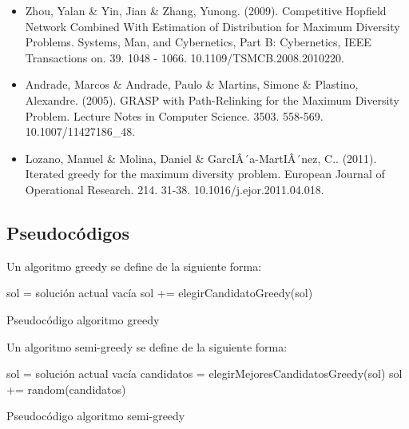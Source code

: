 \documentclass[13pt,a4paper]{article}
\begin{document}
\begin{itemize}
    \item Zhou, Yalan \& Yin, Jian \& Zhang, Yunong. (2009). Competitive Hopfield Network Combined With Estimation of Distribution for Maximum Diversity Problems. Systems, Man, and Cybernetics, Part B: Cybernetics, IEEE Transactions on. 39. 1048 - 1066. 10.1109/TSMCB.2008.2010220. 
    \item Andrade, Marcos \& Andrade, Paulo \& Martins, Simone \& Plastino, Alexandre. (2005). GRASP with Path-Relinking for the Maximum Diversity Problem. Lecture Notes in Computer Science. 3503. 558-569. 10.1007/11427186\_48. 
    \item Lozano, Manuel \& Molina, Daniel \& GarcIÂ´a-MartIÂ´nez, C.. (2011). Iterated greedy for the maximum diversity problem. European Journal of Operational Research. 214. 31-38. 10.1016/j.ejor.2011.04.018. 
\end{itemize}

\subsection{Pseudocódigos}

Un algoritmo greedy se define de la siguiente forma:

\begin{algorithm}[H]
    \SetAlgoLined
        sol = solución actual vacía \;
         {
            sol += elegirCandidatoGreedy(sol) \;
        }        
    \caption{Pseudocódigo algoritmo greedy}
\end{algorithm}


\vspace{\baselineskip}

Un algoritmo semi-greedy se define de la siguiente forma:

\begin{algorithm}[H]
    \SetAlgoLined
        sol = solución actual vacía \;
         {
            candidatos = elegirMejoresCandidatosGreedy(sol) \;
            sol += random(candidatos) \;
        }        
    \caption{Pseudocódigo algoritmo semi-greedy}
\end{algorithm}


\vspace{\baselineskip}
\end{document}
